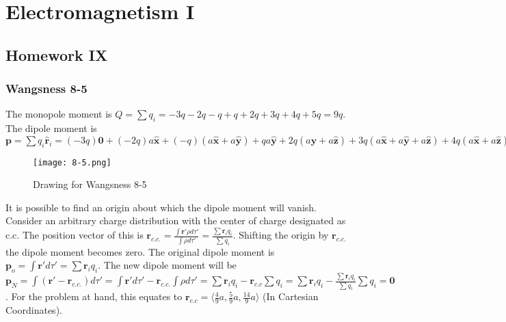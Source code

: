 \documentclass[crop=false,class=article,oneside]{standalone}
\begin{document}
    \ifx\ifsub\undefined
        \section*{Electromagnetism I}
        \setcounter{section}{9}
        \renewcommand\thesubfigure{%
            \arabic{section}.\arabic{figure}.\arabic{subfigure}%
        }
    \fi 
    \subsection{Homework IX}
        \subsubsection{Wangsness 8-5}
        The monopole moment is $Q = \sum q_i = -3q-2q-q+q+2q+3q+4q+5q=9q$.
        The dipole moment is $\mathbf{p} = \sum q_i \hat{\mathbf{r}}_i = (-3q)\mathbf{0} + (-2q)a\hat{\mathbf{x}} + (-q)(a\hat{\mathbf{x}}+a\hat{\mathbf{y}})+qa\hat{\mathbf{y}} + 2q(a\hat{\mathbf{y}}+a\hat{\mathbf{z}})+3q(a\hat{\mathbf{x}}+a\hat{\mathbf{y}}+a\hat{\mathbf{z}})+4q(a\hat{\mathbf{x}}+a\hat{\mathbf{z}})+5qa\hat{\mathbf{z}}=4qa\hat{\mathbf{x}}+5qa\hat{\mathbf{y}}+14aq\hat{\mathbf{z}}$
        \begin{figure}[htbp]
            \centering
            {\texttt{[image: 8-5.png]}}
            \caption{Drawing for Wangsness 8-5}
        \end{figure}
        It is possible to find an origin about which the dipole moment will vanish. Consider an arbitrary charge distribution with the center of charge designated as c.c. The position vector of this is $\mathbf{r}_{c.c.} = \frac{\int \mathbf{r}' \rho d\tau '}{\int \rho d\tau '} = \frac{\sum \mathbf{r}_i q_i}{\sum q_i}$. Shifting the origin by $\mathbf{r}_{c.c.}$ the dipole moment becomes zero. The original dipole moment is $\mathbf{p}_{o} = \int \mathbf{r}' d\tau ' = \sum \mathbf{r}_i q_i$. The new dipole moment will be $\mathbf{p}_N = \int (\mathbf{r}' - \mathbf{r}_{c.c.})d\tau' = \int \mathbf{r}' d\tau' - \mathbf{r}_{c.c.} \int \rho d\tau' = \sum \mathbf{r}_i q_i - \mathbf{r}_{c.c} \sum q_i = \sum \mathbf{r}_i q_i - \frac{\sum \mathbf{r}_i q_i }{\sum q_i}\sum q_i = \mathbf{0}$. For the problem at hand, this equates to $\mathbf{r}_{c.c} = \langle \frac{4}{9}a, \frac{5}{9}a, \frac{14}{9}a\rangle$ (In Cartesian Coordinates).
        \begin{problem}[Wangsness 8-8]
        \end{problem}
\end{document}
